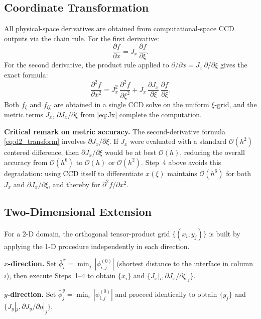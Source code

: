 \documentclass[10pt,a4paper,twocolumn]{article}
\newcommand{\pd}[2]{\dfrac{\partial #1}{\partial #2}}
\newcommand{\pdd}[2]{\dfrac{\partial^2 #1}{\partial #2^2}}
\newcommand{\Ord}[1]{\mathcal{O}(#1)}
\begin{document}
\subsection{Coordinate Transformation}
\label{sec:transform}

All physical-space derivatives are obtained from computational-space CCD
outputs via the chain rule. For the first derivative:
\begin{equation}
  \pd{f}{x} = J_x\,\pd{f}{\xi}.
  \label{eq:d1_transform}
\end{equation}
For the second derivative, the product rule applied to $\partial/\partial x
= J_x\,\partial/\partial\xi$ gives the exact formula:
\begin{equation}
  \pdd{f}{x} = J_x^2\,\pdd{f}{\xi} + J_x\,\pd{J_x}{\xi}\,\pd{f}{\xi}.
  \label{eq:d2_transform}
\end{equation}
Both $f_\xi$ and $f_{\xi\xi}$ are obtained in a single CCD solve on the
uniform $\xi$-grid, and the metric terms $J_x$, $\partial J_x/\partial\xi$
from \cref{eq:Jx} complete the computation.

\medskip
\noindent\textbf{Critical remark on metric accuracy.}
The second-derivative formula \eqref{eq:d2_transform} involves
$\partial J_x/\partial\xi$. If $J_x$ were evaluated with a standard
$\Ord{h^2}$ centered difference, then $\partial J_x/\partial\xi$ would be
at best $\Ord{h}$, reducing the overall accuracy from $\Ord{h^6}$ to
$\Ord{h}$ or $\Ord{h^2}$.  Step~4 above avoids this degradation: using CCD
itself to differentiate $x(\xi)$ maintains $\Ord{h^6}$ for both $J_x$ and
$\partial J_x/\partial\xi$, and thereby for $\partial^2 f/\partial x^2$.

\subsection{Two-Dimensional Extension}
\label{sec:2d}

For a 2-D domain, the orthogonal tensor-product grid $\{(x_i, y_j)\}$ is
built by applying the 1-D procedure independently in each direction.

\textbf{$x$-direction.}  Set $\bar\phi^x_i = \min_j\,|\phi^{(0)}_{i,j}|$
(shortest distance to the interface in column $i$), then execute
Steps~1--4 to obtain $\{x_i\}$ and $\{J_x|_i, \partial J_x/\partial\xi|_i\}$.

\textbf{$y$-direction.}  Set $\bar\phi^y_j = \min_i\,|\phi^{(0)}_{i,j}|$
and proceed identically to obtain $\{y_j\}$ and $\{J_y|_j,
\partial J_y/\partial\eta|_j\}$.
\end{document}
